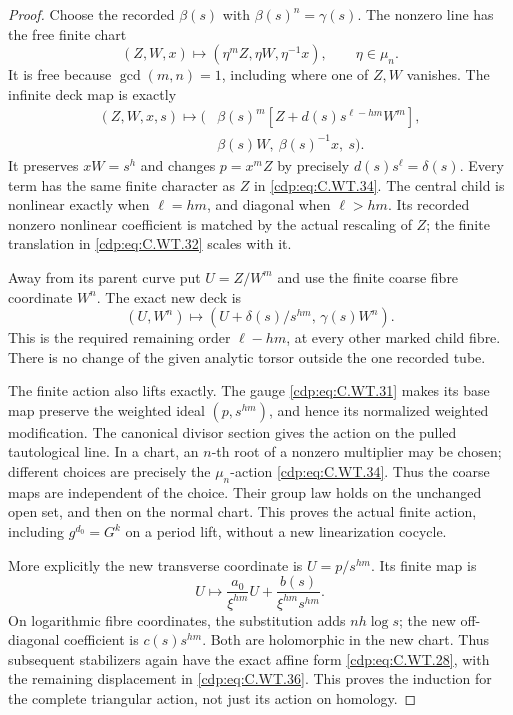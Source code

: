 \begin{proof}
Choose the recorded \(\beta(s)\)
with \(\beta(s)^n=\gamma(s)\).
The nonzero line has the free
finite chart
\[
       (Z,W,x)\longmapsto
                   (\eta^mZ,\eta W,\eta^{-1}x),
                           \qquad\eta\in\mu_n.
 \tag{C.WT.34}\label{cdp:eq:C.WT.34}
\]
It is free because
\(\gcd(m,n)=1\), including
where one of \(Z,W\) vanishes.
The infinite deck map is exactly
\[
 \begin{split}
 (Z,W,x,s)\longmapsto\bigl(
   &\beta(s)^m[Z+d(s)s^{\ell-hm}W^m],\\
   &\beta(s)W,\ \beta(s)^{-1}x,\ s\bigr).
 \end{split}
 \tag{C.WT.35}\label{cdp:eq:C.WT.35}
\]
It preserves \(xW=s^h\) and
changes \(p=x^mZ\) by precisely
\(d(s)s^{\ell}=\delta(s)\).
Every term has the same finite
character as \(Z\) in
\eqref{cdp:eq:C.WT.34}. The central child
is nonlinear exactly when
\(\ell=hm\), and diagonal
when \(\ell>hm\). Its recorded
nonzero nonlinear coefficient
is matched by the actual
rescaling of \(Z\); the finite
translation in \eqref{cdp:eq:C.WT.32}
scales with it.

Away from its parent curve put
\(U=Z/W^m\) and use the finite
coarse fibre coordinate \(W^n\).
The exact new deck is
\[
            (U,W^n)\longmapsto
            (U+\delta(s)/s^{hm},\,\gamma(s)W^n).
 \tag{C.WT.36}\label{cdp:eq:C.WT.36}
\]
This is the required remaining
order \(\ell-hm\), at every
other marked child fibre.
There is no change of the
given analytic torsor outside
the one recorded tube.

The finite action also lifts
exactly. The gauge \eqref{cdp:eq:C.WT.31}
makes its base map preserve
the weighted ideal
\((p,s^{hm})\), and hence its
normalized weighted modification.
The canonical divisor section
gives the action on the pulled
tautological line. In a chart,
an \(n\)-th root of a nonzero
multiplier may be chosen;
different choices are precisely
the \(\mu_n\)-action \eqref{cdp:eq:C.WT.34}.
Thus the coarse maps are
independent of the choice.
Their group law holds on the
unchanged open set, and then
on the normal chart. This
proves the actual finite action,
including \(g^{d_0}=G^k\)
on a period lift, without
a new linearization cocycle.

More explicitly the new
transverse coordinate is
\(U=p/s^{hm}\). Its finite
map is
\[
             U\longmapsto
       \frac{a_0}{\xi^{hm}}U
                 +\frac{b(s)}{\xi^{hm}s^{hm}} .
 \tag{C.WT.37}\label{cdp:eq:C.WT.37}
\]
On logarithmic fibre coordinates,
the substitution adds \(nh\log s\);
the new off-diagonal coefficient
is \(c(s)s^{hm}\). Both are
holomorphic in the new chart.
Thus subsequent stabilizers
again have the exact affine
form \eqref{cdp:eq:C.WT.28}, with the
remaining displacement in
\eqref{cdp:eq:C.WT.36}. This proves the
induction for the complete
triangular action, not just
its action on homology.


\end{proof}
